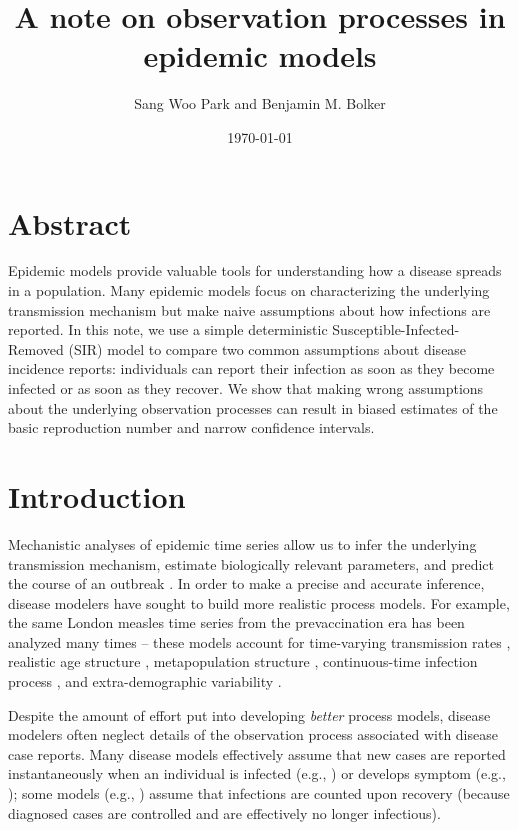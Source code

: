 \documentclass[12pt]{article}\usepackage[]{graphicx}\usepackage[]{color}
\title{A note on observation processes in epidemic models}
\author{Sang Woo Park and Benjamin M. Bolker}
\date{\today}
\begin{document}
\maketitle

\section*{Abstract}

Epidemic models provide valuable tools for understanding how a disease
spreads in a population. Many epidemic models focus on characterizing
the underlying transmission mechanism but make naive assumptions about
how infections are reported. In this note, we use a simple deterministic
Susceptible-Infected-Removed (SIR) model to compare two common assumptions 
about disease incidence reports: individuals can report their infection as soon as
they become infected or as soon as they recover. We show that making
wrong assumptions about the underlying observation processes can result
in biased estimates of the basic reproduction number and narrow confidence
intervals.

\section{Introduction}

Mechanistic analyses of epidemic time series allow us to infer the underlying 
transmission mechanism, estimate biologically relevant parameters, and 
predict the course of an outbreak \citep{breto2009time}. In order to make a 
precise and accurate inference, disease modelers have sought to build
more realistic process models. For example, the same London measles time 
series from the prevaccination era has been analyzed many times -- 
these models account for time-varying transmission rates \citep{fine1982measles}, 
realistic age structure \citep{schenzle1984age},
metapopulation structure \citep{xia2004measles}, continuous-time infection process 
\citep{cauchemez2008likelihood}, and extra-demographic variability \citep{he2009plug}. 

Despite the amount of effort put into developing \emph{better} process models, disease 
modelers often neglect details of the observation process associated with disease
case reports. Many disease models effectively assume that new cases are reported
instantaneously when an individual is infected (e.g., \cite{martinez2016differential, 
kennedy2018modeling, pons2018serotype}) or develops symptom (e.g., 
\cite{bhadra2011malaria, king2015avoidable}); 
some models (e.g., \cite{breto2009time, he2009plug, lin2016seasonality})
assume that infections are counted upon recovery (because diagnosed cases
are controlled and are effectively no longer infectious). 
\end{document}
